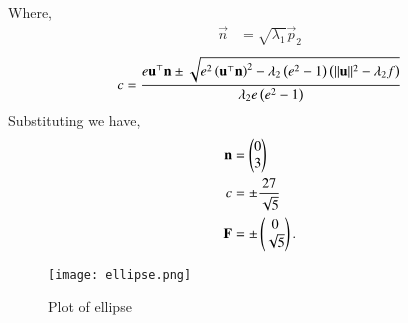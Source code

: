 \documentclass[journal,12pt,twocolumn]{IEEEtran}
\begin{document}
Where,
\begin{align}
    \vec{n} &= \sqrt{\lambda_1}\vec{p}_2
\end{align}
\begin{multline}
     c = \frac{e\mathbf{u}^{\top}\mathbf{n} \pm \sqrt{e^2\left(\mathbf{u}^{\top}\mathbf{n}\right)^2-\lambda_2\left(e^2-1\right)\left(\lVert\mathbf{u}\rVert^2 - \lambda_2 f\right)}}{\lambda_2e\left(e^2-1\right)} 
\end{multline}
Substituting we have,
\begin{align}
    \mathbf{n} &= \begin{pmatrix}0\\3\end{pmatrix}\\ c &= \pm\frac{27}{\sqrt{5}}\\
    \mathbf{F} &= \pm\begin{pmatrix}0 \\ \sqrt{5}\end{pmatrix}.
\end{align}

\begin{figure}[h!]
\centering
\texttt{[image: ellipse.png]}
\caption{Plot of ellipse}
\label{fig:ellipse}
\end{figure}
\end{document}
